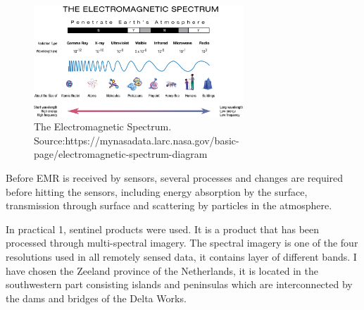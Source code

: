 \documentclass[
  letterpaper,
  DIV=11,
  numbers=noendperiod]{scrreprt}
\begin{document}
\begin{figure}

{\centering \includegraphics[width=0.7\textwidth,height=\textheight]{./figures/electromagnetic spectrum.png}

}

\caption{The Electromagnetic Spectrum.
Source:https://mynasadata.larc.nasa.gov/basic-page/electromagnetic-spectrum-diagram}

\end{figure}

Before EMR is received by sensors, several processes and changes are
required before hitting the sensors, including energy absorption by the
surface, transmission through surface and scattering by particles in the
atmosphere.

In practical 1, sentinel products were used. It is a product that has
been processed through multi-spectral imagery. The spectral imagery is
one of the four resolutions used in all remotely sensed data, it
contains layer of different bands. I have chosen the Zeeland province of
the Netherlands, it is located in the southwestern part consisting
islands and peninsulas which are interconnected by the dams and bridges
of the Delta Works.
\end{document}
